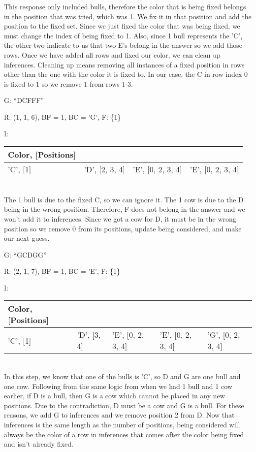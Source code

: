 \documentclass[11pt]{article}
\begin{document}
    This response only included bulls, therefore the color that is being fixed belongs in the position that was tried, which was 1. We fix it in that position and add the position to the fixed set. Since we just fixed the color that was being fixed, we must change the index of being fixed to 1. Also, since 1 bull represents the 'C', the other two indicate to us that two E's belong in the answer so we add those rows. Once we have added all rows and fixed our color, we can clean up inferences. Cleaning up means removing all instances of a fixed position in rows other than the one with the color it is fixed to. In our case, the C in row index 0 is fixed to 1 so we remove 1 from rows 1-3.

    \noindent G: \enquote{DCFFF}
    
    \noindent R: (1, 1, 6), BF = 1, BC = 'G', F: \{1\}

    \noindent I: \begin{tabularx}{.85\textwidth}{|X|X|X|X|}
        \hline
        Color, [Positions]&&&\\\hline 
        'C', [1]&'D', [2, 3, 4]&'E', [0, 2, 3, 4]&'E', [0, 2, 3, 4]\\\hline
    \end{tabularx}\\

    The 1 bull is due to the fixed C, so we can ignore it. The 1 cow is due to the D being in the wrong position. Therefore, F does not belong in the answer and we won't add it to inferences. Since we got a cow for D, it must be in the wrong position so we remove 0 from its positions, update being considered, and make our next guess.

    \noindent G: \enquote{GCDGG}

    \noindent R: (2, 1, 7), BF = 1, BC = 'E', F: \{1\}

    \noindent I: \begin{tabularx}{\textwidth}{|X|X|X|X|X|}
        \hline
        Color, [Positions]&&&&\\\hline 
        'C', [1]&'D', [3, 4]&'E', [0, 2, 3, 4]&'E', [0, 2, 3, 4]&'G', [0, 2, 3, 4]\\\hline
    \end{tabularx}\\

    In this step, we know that one of the bulls is 'C', so D and G are one bull and one cow. Following from the same logic from when we had 1 bull and 1 cow earlier, if D is a bull, then G is a cow which cannot be placed in any new positions. Due to the contradiction, D must be a cow and G is a bull. For these reasons, we add G to inferences and we remove position 2 from D. Now that inferences is the same length as the number of positions, being considered will always be the color of a row in inferences that comes after the color being fixed and isn't already fixed.
    
\end{document}
